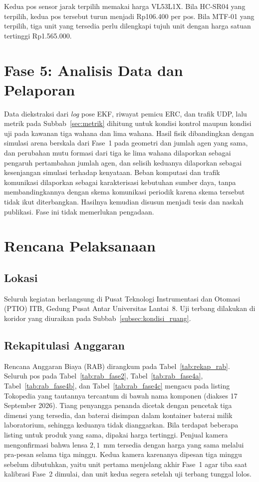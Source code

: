 \documentclass[12pt,a4paper]{report}
\begin{document}
Kedua pos sensor jarak terpilih memakai harga VL53L1X. Bila HC-SR04 yang terpilih, kedua pos tersebut turun menjadi Rp106.400 per pos. Bila MTF-01 yang terpilih, tiga unit yang tersedia perlu dilengkapi tujuh unit dengan harga satuan tertinggi Rp1.565.000.


\section{Fase 5: Analisis Data dan Pelaporan}

Data diekstraksi dari \textit{log} pose EKF, riwayat pemicu ERC, dan trafik UDP, lalu metrik pada Subbab~\ref{sec:metrik} dihitung untuk kondisi kontrol maupun kondisi uji pada kawanan tiga wahana dan lima wahana. Hasil fisik dibandingkan dengan simulasi arena berskala dari Fase~1 pada geometri dan jumlah agen yang sama, dan perubahan mutu formasi dari tiga ke lima wahana dilaporkan sebagai pengaruh pertambahan jumlah agen, dan selisih keduanya dilaporkan sebagai kesenjangan simulasi terhadap kenyataan. Beban komputasi dan trafik komunikasi dilaporkan sebagai karakterisasi kebutuhan sumber daya, tanpa membandingkannya dengan skema komunikasi periodik karena skema tersebut tidak ikut diterbangkan. Hasilnya kemudian disusun menjadi tesis dan naskah publikasi. Fase ini tidak memerlukan pengadaan.

\section{Rencana Pelaksanaan}

\subsection{Lokasi}
Seluruh kegiatan berlangsung di Pusat Teknologi Instrumentasi dan Otomasi (PTIO\label{abbr:ptio}) ITB, Gedung Pusat Antar Universitas Lantai~8. Uji terbang dilakukan di koridor yang diuraikan pada Subbab~\ref{subsec:kondisi_ruang}.

\subsection{Rekapitulasi Anggaran}
\label{subsec:rab}

Rencana Anggaran Biaya (RAB\label{abbr:rab}) dirangkum pada Tabel~\ref{tab:rekap_rab}. Seluruh pos pada Tabel~\ref{tab:rab_fase2}, Tabel~\ref{tab:rab_fase4a}, Tabel~\ref{tab:rab_fase4b}, dan Tabel~\ref{tab:rab_fase4c} mengacu pada listing Tokopedia yang tautannya tercantum di bawah nama komponen (diakses 17 September 2026). Tiang penyangga penanda dicetak dengan pencetak tiga dimensi yang tersedia, dan baterai disimpan dalam kontainer baterai milik laboratorium, sehingga keduanya tidak dianggarkan. Bila terdapat beberapa listing untuk produk yang sama, dipakai harga tertinggi. Penjual kamera mengonfirmasi bahwa lensa $2{,}1$~mm tersedia dengan harga yang sama melalui pra-pesan selama tiga minggu. Kedua kamera karenanya dipesan tiga minggu sebelum dibutuhkan, yaitu unit pertama menjelang akhir Fase~1 agar tiba saat kalibrasi Fase~2 dimulai, dan unit kedua segera setelah uji terbang tunggal lolos.
\end{document}
